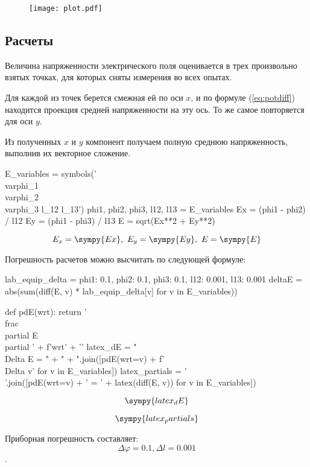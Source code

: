 \documentclass[12pt, a4paper]{article}
\begin{document}
\begin{figure}[H]
\texttt{[image: plot.pdf]}
\end{figure}

\subsection*{Расчеты}

Величина напряженности электрического поля оценивается в трех произвольно
взятых точках, для которых сняты измерения во всех опытах.

Для каждой из точек берется смежная ей по оси $x$, и по формуле (\ref{eq:potdiff})
находится проекция средней напряженности на эту ось. То же самое повторяется
для оси $y$.

Из полученных $x$ и $y$ компонент получаем полную среднюю напряженность,
выполнив их векторное сложение.

\begin{sympycode}
E_variables = symbols('\\varphi_1 \\varphi_2 \\varphi_3 l_{12} l_{13}')
phi1, phi2, phi3, l12, l13 = E_variables
Ex = (phi1 - phi2) / l12
Ey = (phi1 - phi3) / l13
E = sqrt(Ex**2 + Ey**2)
\end{sympycode}

$$E_x=\sympy{Ex},\ E_y=\sympy{Ey},\ E=\sympy{E}$$

Погрешность расчетов можно высчитать по следующей формуле:

\begin{sympycode}
lab_equip_delta = { phi1: 0.1, phi2: 0.1, phi3: 0.1, l12: 0.001, l13: 0.001 }
deltaE = abs(sum(diff(E, v) * lab_equip_delta[v] for v in E_variables))

def pdE(wrt): return '\\frac{\\partial E}{\\partial ' + f'{wrt}' + '}'
latex_dE = "\\Delta E = " + " + ".join([pdE(wrt=v) + f'\\Delta {v}' for v in E_variables])
latex_partials = '$$$$'.join([pdE(wrt=v) + ' = ' + latex(diff(E, v)) for v in E_variables])
\end{sympycode}

$$\sympy{latex_dE}$$

$$\sympy{latex_partials}$$

Приборная погрешность составляет:
$$\Delta\varphi = 0.1, \Delta l = 0.001$$.
\end{document}
